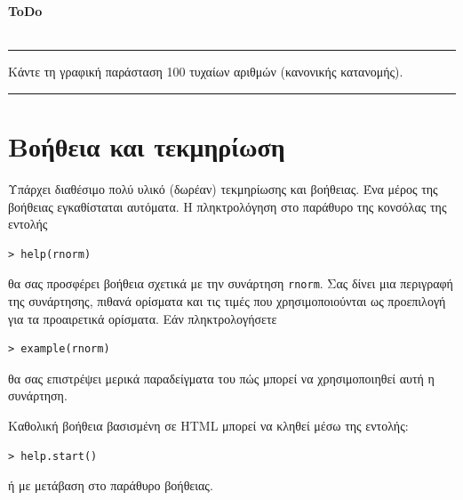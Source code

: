 \documentclass[a4paper,10pt,twocolumn]{article}
\newenvironment{ToDo} {
  \begin{flushright}
    \hfill
    \begin{minipage}{0.9\columnwidth}
    \textsf{\textbf{ToDo}} \\
      \vspace{-0.7cm}\\
      {\color{Gray}\rule[-0.05cm]{\columnwidth}{1.5pt}}} {
      {\color{Gray}\rule[0.3cm]{\columnwidth}{1.5pt}}
    \end{minipage}
    \vspace{0.3cm}
  \end{flushright}
  }
\begin{document}
\begin{ToDo}
Κάντε τη γραφική παράσταση 100 τυχαίων αριθμών (κανονικής κατανομής).\\
\end{ToDo}


\section{Βοήθεια και τεκμηρίωση}
\label{sec:help}

Υπάρχει διαθέσιμο πολύ υλικό (δωρέαν) τεκμηρίωσης και βοήθειας. Ένα μέρος της βοήθειας εγκαθίσταται
αυτόματα. Η πληκτρολόγηση στο παράθυρο της κονσόλας της εντολής

\begin{Verbatim}[frame=single,gobble=0]
> help(rnorm)
\end{Verbatim}

θα σας προσφέρει βοήθεια σχετικά με την συνάρτηση \texttt{rnorm}. Σας δίνει μια περιγραφή της συνάρτησης,
πιθανά ορίσματα και τις τιμές που χρησιμοποιούνται ως προεπιλογή για τα προαιρετικά ορίσματα. Εάν
πληκτρολογήσετε

\begin{Verbatim}[frame=single,gobble=0]
> example(rnorm)
\end{Verbatim}

θα σας επιστρέψει μερικά παραδείγματα του πώς μπορεί να χρησιμοποιηθεί αυτή η συνάρτηση.

Καθολική βοήθεια βασισμένη σε HTML μπορεί να κληθεί μέσω της εντολής:

\begin{Verbatim}[frame=single,gobble=0]
> help.start()
\end{Verbatim}

ή με μετάβαση στο παράθυρο βοήθειας.
\end{document}
